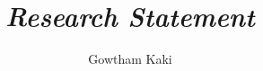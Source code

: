 \documentclass[11pt]{article}
\date{}
\begin{document}
\title{\itshape\color{MidnightBlue} Research Statement}

\author{Gowtham Kaki}

\maketitle




{
}


\small

\end{document}
